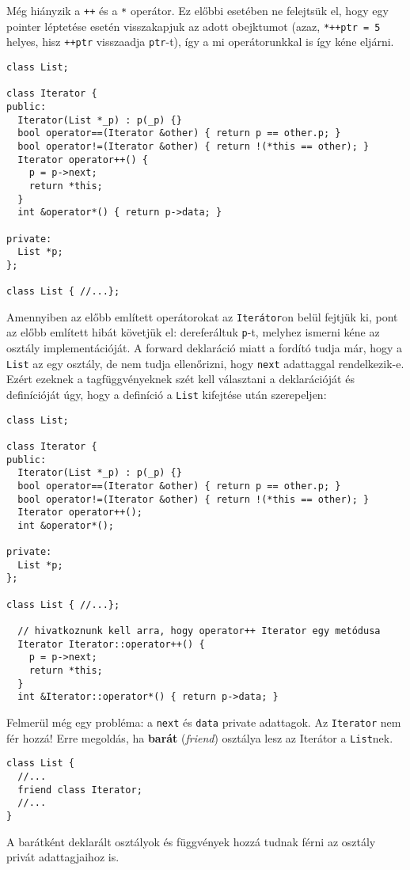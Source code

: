 \documentclass[../cpp_book/cpp_book.tex]{subfiles}
\begin{document}
	\medskip
	Még hiányzik a \texttt{++} és a \texttt{*} operátor. Ez előbbi esetében ne felejtsük el, hogy egy pointer léptetése esetén visszakapjuk az adott obejktumot (azaz, \texttt{*++ptr = 5} helyes, hisz \texttt{++ptr} visszaadja \texttt{ptr}-t), így a mi operátorunkkal is így kéne eljárni.
\begin{lstlisting}
class List;

class Iterator {
public:
  Iterator(List *_p) : p(_p) {}
  bool operator==(Iterator &other) { return p == other.p; }
  bool operator!=(Iterator &other) { return !(*this == other); }
  Iterator operator++() {
    p = p->next;
    return *this;
  }
  int &operator*() { return p->data; }

private:
  List *p;
};

class List { //...};
\end{lstlisting}
	Amennyiben az előbb említett operátorokat az \texttt{Iterátor}on belül fejtjük ki, pont az előbb említett hibát követjük el: dereferáltuk \texttt{p}-t, melyhez ismerni kéne az osztály implementációját. A forward deklaráció miatt a fordító tudja már, hogy a \texttt{List} az egy osztály, de nem tudja ellenőrizni, hogy \texttt{next} adattaggal rendelkezik-e. Ezért ezeknek a tagfüggvényeknek szét kell választani a deklarációját és definícióját úgy, hogy a definíció a \texttt{List} kifejtése után szerepeljen:
\begin{lstlisting}
class List;

class Iterator {
public:
  Iterator(List *_p) : p(_p) {}
  bool operator==(Iterator &other) { return p == other.p; }
  bool operator!=(Iterator &other) { return !(*this == other); }
  Iterator operator++();
  int &operator*();

private:
  List *p;
};

class List { //...};

  // hivatkoznunk kell arra, hogy operator++ Iterator egy metódusa
  Iterator Iterator::operator++() {
    p = p->next;
    return *this;
  }
  int &Iterator::operator*() { return p->data; }
\end{lstlisting}
  Felmerül még egy probléma: a \texttt{next} és \texttt{data} private adattagok. Az \texttt{Iterator} nem fér hozzá! Erre megoldás, ha \textbf{barát} (\textit{friend}) osztálya lesz az Iterátor a \texttt{List}nek.
	\begin{lstlisting}
class List {
  //...
  friend class Iterator;
  //...
}
	\end{lstlisting}
	A barátként deklarált osztályok és függvények hozzá tudnak férni az osztály privát adattagjaihoz is.
	
\end{document}

